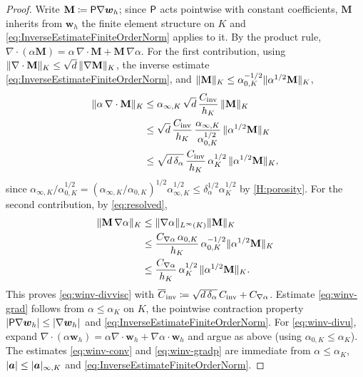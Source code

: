 \begin{proof}
Write $\mathbf{M}\coloneqq\mathsf{P}\nabla\boldsymbol{w}_h$; since $\mathsf{P}$ acts pointwise with
constant coefficients, $\mathbf{M}$ inherits from $\boldsymbol{w}_h$ the finite element structure
on $K$ and \eqref{eq:InverseEstimateFiniteOrderNorm} applies to it. By the product
rule, $\nabla\cdot(\alpha\mathbf{M})=\alpha\,\nabla\cdot\mathbf{M}
+\mathbf{M}\,\nabla\alpha$. For the first contribution, using
$\lVert\nabla\cdot\mathbf{M}\rVert_K\le\sqrt{d}\,\lVert\nabla\mathbf{M}\rVert_K$, the inverse
estimate \eqref{eq:InverseEstimateFiniteOrderNorm}, and
$\lVert\mathbf{M}\rVert_K\le\alpha_{0,K}^{-1/2}\lVert\alpha^{1/2}\mathbf{M}\rVert_K$,
\[
\begin{aligned}
  \lVert\alpha\,\nabla\cdot\mathbf{M}\rVert_K
  &\le \alpha_{\infty,K}\,\sqrt{d}\,\frac{C_{\mathrm{inv}}}{h_K}\,\lVert\mathbf{M}\rVert_K \\
  &\le \sqrt{d}\,\frac{C_{\mathrm{inv}}}{h_K}\,\frac{\alpha_{\infty,K}}{\alpha_{0,K}^{1/2}}\,\lVert\alpha^{1/2}\mathbf{M}\rVert_K \\
  &\le \sqrt{d\,\delta_\alpha}\,\frac{C_{\mathrm{inv}}}{h_K}\,\alpha_K^{1/2}\,\lVert\alpha^{1/2}\mathbf{M}\rVert_K,
\end{aligned}
\]
since $\alpha_{\infty,K}/\alpha_{0,K}^{1/2}
=(\alpha_{\infty,K}/\alpha_{0,K})^{1/2}\alpha_{\infty,K}^{1/2}
\le\delta_\alpha^{1/2}\alpha_K^{1/2}$ by \cref{H:porosity}. For the second contribution,
by \eqref{eq:resolved},
\[
\begin{aligned}
  \lVert\mathbf{M}\,\nabla\alpha\rVert_K
  &\le \lVert\nabla\alpha\rVert_{L^\infty(K)}\lVert\mathbf{M}\rVert_K \\
  &\le \frac{C_{\nabla\alpha}\,\alpha_{0,K}}{h_K}\,
  \alpha_{0,K}^{-1/2}\lVert\alpha^{1/2}\mathbf{M}\rVert_K \\
  &\le \frac{C_{\nabla\alpha}}{h_K}\,\alpha_K^{1/2}\,
  \lVert\alpha^{1/2}\mathbf{M}\rVert_K .
\end{aligned}
\]
This proves \eqref{eq:winv-divvisc} with
$\overline{C}_{\mathrm{inv}}\coloneqq\sqrt{d\,\delta_\alpha}\,C_{\mathrm{inv}}+C_{\nabla\alpha}$. Estimate
\eqref{eq:winv-grad} follows from $\alpha\le\alpha_K$ on $K$, the pointwise contraction
property $|\mathsf{P}\nabla\boldsymbol{w}_h|\le|\nabla\boldsymbol{w}_h|$ and
\eqref{eq:InverseEstimateFiniteOrderNorm}. For \eqref{eq:winv-divu}, expand
$\nabla\cdot(\alpha\boldsymbol{w}_h)=\alpha\nabla\cdot\boldsymbol{w}_h
+\nabla\alpha\cdot\boldsymbol{w}_h$ and argue as above (using $\alpha_{0,K}\le\alpha_K$).
The estimates \eqref{eq:winv-conv} and \eqref{eq:winv-gradp} are immediate from
$\alpha\le\alpha_K$, $|\boldsymbol{a}|\le|\boldsymbol{a}|_{\infty,K}$ and \eqref{eq:InverseEstimateFiniteOrderNorm}.
\end{proof}

